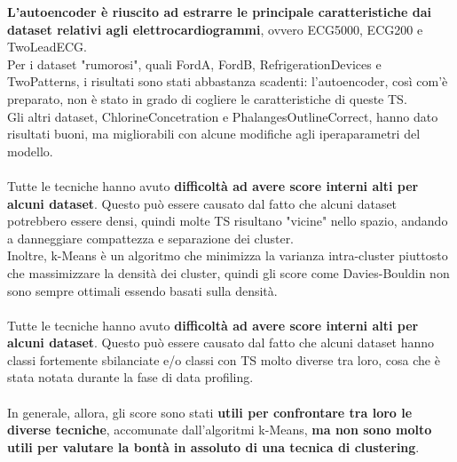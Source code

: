 \textbf{L'autoencoder è riuscito ad estrarre le principale caratteristiche dai dataset relativi agli elettrocardiogrammi}, ovvero ECG5000, ECG200 e TwoLeadECG.\\
Per i dataset "rumorosi", quali FordA, FordB, RefrigerationDevices e TwoPatterns, i risultati sono stati abbastanza scadenti: l'autoencoder, così com'è preparato, non è stato in grado di cogliere le caratteristiche di queste TS.\\
Gli altri dataset, ChlorineConcetration e PhalangesOutlineCorrect, hanno dato risultati buoni, ma migliorabili con alcune modifiche agli iperaparametri del modello.\\
\\
Tutte le tecniche hanno avuto \textbf{difficoltà ad avere score interni alti per alcuni dataset}. Questo può essere causato dal fatto che alcuni dataset potrebbero essere densi, quindi molte TS risultano "vicine" nello spazio, andando a danneggiare compattezza e separazione dei cluster.\\
Inoltre, k-Means è un algoritmo che minimizza la varianza intra-cluster piuttosto che massimizzare la densità dei cluster, quindi gli score come Davies-Bouldin non sono sempre ottimali essendo basati sulla densità.\\
\\
Tutte le tecniche hanno avuto \textbf{difficoltà ad avere score interni alti per alcuni dataset}. Questo può essere causato dal fatto che alcuni dataset hanno classi fortemente sbilanciate e/o classi con TS molto diverse tra loro, cosa che è stata notata durante la fase di data profiling.\\
\\
In generale, allora, gli score sono stati \textbf{utili per confrontare tra loro le diverse tecniche}, accomunate dall'algoritmi k-Means, \textbf{ma non sono molto utili per valutare la bontà in assoluto di una tecnica di clustering}.